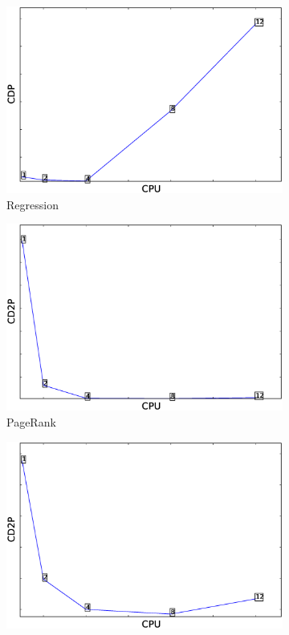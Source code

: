 \begin{figure}
\begin{subfigure}[b]{0.3\textwidth}
        \includegraphics[width=\textwidth]{Chapter-8/figures/regression_cpu_CDP_12_1.eps}
        \caption{Regression}
        \label{fig:regression_cdp}
    \end{subfigure}
    \bigskip
    \begin{subfigure}[b]{0.3\textwidth}
        \includegraphics[width=\textwidth]{Chapter-8/figures/pagerank_cpu_CD2P_12_1.eps}
        \caption{PageRank}
        \label{fig:pagerank_cd2p}
    \end{subfigure}
    \begin{subfigure}[b]{0.3\textwidth}
        \includegraphics[width=\textwidth]{Chapter-8/figures/webloganalysis_cpu_CD2P_12_1.eps}

\end{subfigure}
\end{figure}
